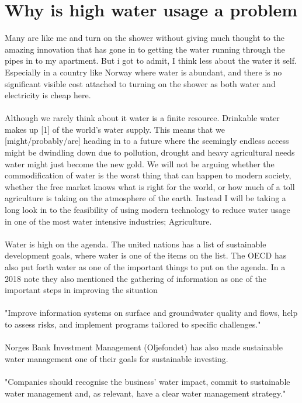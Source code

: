 \documentclass[]{uiophd}
\begin{document}
\section{Why is high water usage a problem}
Many are like me and turn on the shower without giving much thought to the amazing innovation that has gone in to getting the water running through the pipes in to my apartment. But i got to admit, I think less about the water it self. Especially in a country like Norway where water is abundant, and there is no significant visible cost attached to turning on the shower as both water and electricity is cheap here.
\\\\
Although we rarely think about it water is a finite resource. Drinkable water makes up [1] of the world's water supply. This means that we [might/probably/are] heading in to a future where the seemingly endless access might be dwindling down due to pollution, drought and heavy agricultural needs water might just become the new gold. We will not be arguing whether the commodification of water is the worst thing that can happen to modern society, whether the free market knows what is right for the world, or how much of a toll agriculture is taking on the atmosphere of the earth. Instead I will be taking a long look in to the feasibility of using modern technology to reduce water usage in one of the most water intensive industries; Agriculture.
\\\\
Water is high on the agenda. The united nations has a list of sustainable development goals, where water is one of the items on the list. The OECD has also put forth water as one of the important things to put on the agenda. In a 2018 note they also mentioned the gathering of information as one of the important steps in improving the situation 
\\\\
"Improve information systems on surface and groundwater quality and flows, help to assess risks, and implement programs tailored to specific challenges."
\\\\
Norges Bank Investment Management (Oljefondet) has also made sustainable water management one of their goals for sustainable investing. 
\\\\
"Companies should recognise the business’
water impact, commit to sustainable water
management and, as relevant, have a clear
water management strategy."
\end{document}
